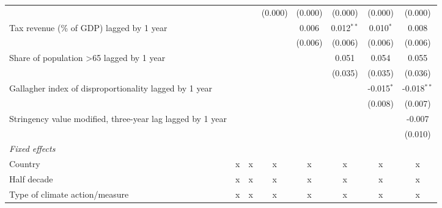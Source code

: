 \begin{tabular}{lccccccc}
                                                                                       &              &              & (0.000)     & (0.000) & (0.000)      & (0.000)      & (0.000)\\   
   Tax revenue (\% of GDP) lagged by 1 year                                            &              &              &             & 0.006   & 0.012$^{**}$ & 0.010$^{*}$  & 0.008\\   
                                                                                       &              &              &             & (0.006) & (0.006)      & (0.006)      & (0.006)\\   
   Share of population >65 lagged by 1 year                                            &              &              &             &         & 0.051        & 0.054        & 0.055\\   
                                                                                       &              &              &             &         & (0.035)      & (0.035)      & (0.036)\\   
   Gallagher index of disproportionality lagged by 1 year                              &              &              &             &         &              & -0.015$^{*}$ & -0.018$^{**}$\\   
                                                                                       &              &              &             &         &              & (0.008)      & (0.007)\\   
   Stringency value modified, three-year lag lagged by 1 year                          &              &              &             &         &              &              & -0.007\\   
                                                                                       &              &              &             &         &              &              & (0.010)\\   
   \emph{Fixed effects}\\
   Country                                                                             & x            & x            & x           & x       & x            & x            & x\\  
   Half decade                                                                         & x            & x            & x           & x       & x            & x            & x\\  
   Type of climate action/measure                                                      & x            & x            & x           & x       & x            & x            & x\\  

\end{tabular}
